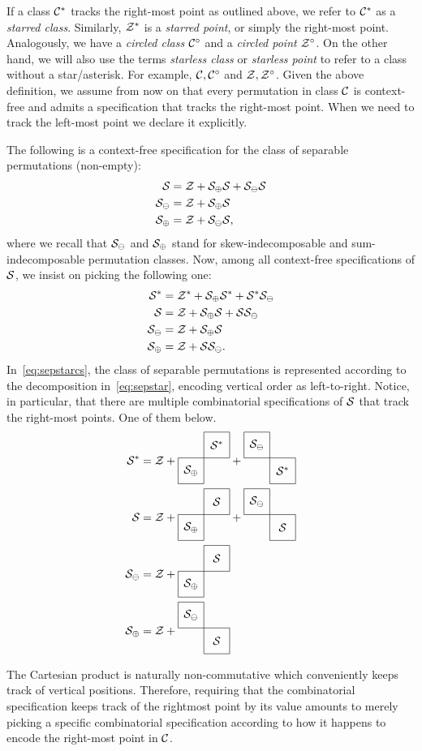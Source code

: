 \documentclass[12pt, a4paper, twoside]{report}
\begin{document}
If a class $\C^*$ tracks the right-most point as outlined above, we refer to $\C^*$ as a \emph{starred class}. Similarly, $\Z^*$ is a \emph{starred point}, or simply the right-most point. Analogously, we have a \emph{circled class} $\C^\circ$ and a \emph{circled point} $\Z^\circ$. On the other hand, we will also use the terms \emph{starless class} or \emph{starless point} to refer to a class without a star/asterisk. For example, $\C, \C^\circ$ and $\Z, \Z^\circ$. Given the above definition, we assume from now on that every permutation in class $\C$ is context-free and admits a specification that tracks the right-most point. When we need to track the left-most point we declare it explicitly.
\begin{example}
  The following is a context-free specification for the class of separable permutations (non-empty):
  \begin{align*}
    \S &= \Z + \S_{\oplus}\S + \S_{\ominus}\S\\
    \S_{\ominus} &= \Z + \S_\oplus\S\\
    \S_\oplus &= \Z + \S_\ominus\S,
  \end{align*}
  where we recall that $\S_\ominus$ and $\S_\oplus$ stand for skew-indecomposable and sum-indecomposable permutation classes. Now, among all context-free specifications of $\S$, we insist on picking the following one:
  \begin{align}
    \begin{aligned}
    \S^* &= \Z^* + \S_{\oplus}\S^* + \S^*\S_{\ominus}\\
    \S &= \Z + \S_{\oplus}\S + \S\S_{\ominus}\\
    \S_{\ominus} &= \Z + \S_\oplus\S\\
    \S_\oplus &= \Z + \S\S_\ominus.
    \label{eq:sepstarcs}
  \end{aligned}
  \end{align}
  In~\eqref{eq:sepstarcs}, the class of separable permutations is represented according to the decomposition in~\eqref{eq:sepstar}, encoding vertical order as left-to-right. Notice, in particular, that there are multiple combinatorial specifications of $\S$ that track the right-most points. One of them below.
  \begin{align}
    \begin{aligned}
      \S^* &= \Z + \cplusc{\S_\oplus}{\S^*} + \cminusc{\S^*}{\S_\ominus}\\
      \S &= \Z + \cplusc{\S_\oplus}{\S} + \cminusc{\S}{\S_\ominus}\\
      \S_\ominus &= \Z + \cplusc{\S_\oplus}{\S}\\
      \S_\oplus &= \Z + \cminusc{\S}{\S_\ominus}
    \end{aligned}
                  \label{eq:sepstar}
  \end{align}
\end{example}
The Cartesian product is naturally non-commutative which conveniently keeps track of vertical positions. Therefore, requiring that the combinatorial specification keeps track of the rightmost point by its value amounts to merely picking a specific combinatorial specification according to how it happens to encode the right-most point in $\C$. 
\end{document}

